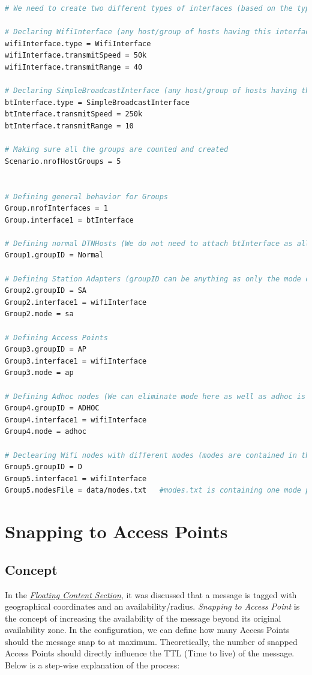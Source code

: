 \begin{lstlisting}[language=bash]
# We need to create two different types of interfaces (based on the types of interface, either DTNHost or DTNHostWithWifi object is created)

# Declaring WifiInterface (any host/group of hosts having this interface will be the DTNHostWithWifi hosts)
wifiInterface.type = WifiInterface
wifiInterface.transmitSpeed = 50k
wifiInterface.transmitRange = 40

# Declaring SimpleBroadcastInterface (any host/group of hosts having this interface will be the DTNHost hosts)
btInterface.type = SimpleBroadcastInterface
btInterface.transmitSpeed = 250k
btInterface.transmitRange = 10

# Making sure all the groups are counted and created
Scenario.nrofHostGroups = 5


# Defining general behavior for Groups
Group.nrofInterfaces = 1
Group.interface1 = btInterface

# Defining normal DTNHosts (We do not need to attach btInterface as all the groups would have the btInterface by default)
Group1.groupID = Normal

# Defining Station Adapters (groupID can be anything as only the mode can identify between different types of hosts)
Group2.groupID = SA           
Group2.interface1 = wifiInterface
Group2.mode = sa

# Defining Access Points
Group3.groupID = AP
Group3.interface1 = wifiInterface
Group3.mode = ap

# Defining Adhoc nodes (We can eliminate mode here as well as adhoc is the default mode)
Group4.groupID = ADHOC
Group4.interface1 = wifiInterface
Group4.mode = adhoc

# Declearing Wifi nodes with different modes (modes are contained in the modesFile)
Group5.groupID = D
Group5.interface1 = wifiInterface
Group5.modesFile = data/modes.txt   #modes.txt is containing one mode per line. The mode is applied to the hosts in the same order

\end{lstlisting}
\newpage
\section{Snapping to Access Points}
\subsection{Concept}
In the \hyperref[section:floating-content]{\emph{Floating Content Section}}, it was discussed that a message is tagged with geographical coordinates and an availability/radius. \textit{Snapping to Access Point} is the concept of increasing the availability of the message beyond its original availability zone. In the configuration, we can define how many Access Points should the message snap to at maximum. Theoretically, the number of snapped Access Points should directly influence the TTL (Time to live) of the message. Below is a step-wise explanation of the process:

